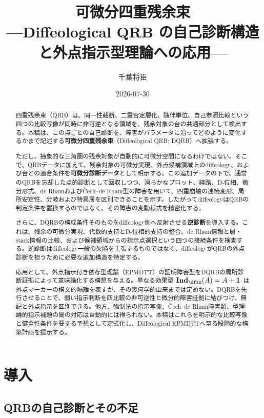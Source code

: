 \documentclass[a4paper,11pt]{ltjsarticle}
\title{可微分四重残余束\\
{\large ---Diffeological QRB の自己診断構造と外点指示型理論への応用---}}
\author{千葉将臣}
\date{2026-07-30}
\theoremstyle{definition}
\theoremstyle{plain}
\newcommand{\Ind}{\mathbf{Ind}_{\dfix}}
\newcommand{\Unit}{\mathbf 1}
\begin{document}
\maketitle

\begin{abstract}
四重残余束（QRB）は、同一性截断、二重否定層化、随伴単位、自己参照比較という四つの比較写像が同時に非可逆となる領域を、残余対象の台の共通部分として検出する。本稿は、この点ごとの自己診断を、障害がパラメータに沿ってどのように変化するかまで記述する\textbf{可微分四重残余束}（Diffeological QRB; DQRB）へ拡張する。

ただし、抽象的な三角圏の残余対象が自動的に可微分空間になるわけではない。そこで、QRBデータに加えて、残余対象の可微分実現、外点候補領域上のdiffeology、および台との適合条件を\textbf{可微分診断データ}として明示する。この追加データの下で、通常のQRBを忘却した点的診断として回収しつつ、滑らかなプロット、経路、D-位相、微分形式、de Rhamおよび\v{C}ech--de Rham型の障害を用いて、四重崩壊の連続変形、局所安定性、分岐および特異層を区別できることを示す。したがってdiffeologyはQRBの判定条件を置換するのではなく、その障害の変動様式を精密化する。

さらに、DQRBの構成条件そのものをdiffeology側へ反射させる\textbf{逆診断}を導入する。これは、残余の可微分実現、代数的支持とD-位相的支持の整合、de Rham情報と層・stack情報の比較、および候補領域からの指示点選択という四つの接続条件を検査する。逆診断はdiffeology一般の欠陥を主張するものではなく、diffeologyがQRBの外点診断を担うために必要な追加構造を特定する。

応用として、外点指示付き依存型理論（EPMDTT）の証明障害型をDQRBの局所診断証拠によって意味論化する構想を与える。単なる効果型 $\Ind(A)=A+\Unit$ は外点マーカーの構文的隔離を表すが、その幾何学的由来までは定めない。DQRBを先行させることで、弱い指示判断を四比較の非可逆性と微分的障害証拠に結びつけ、無記と外点指示を区別できる。他方、強制法の指示写像、\v{C}ech--de Rham障害類、型理論的指示補題の間の対応は自動的には得られない。本稿はこれらを明示的な比較写像と健全性条件を要する予想として定式化し、Diffeological EPMDTTへ至る段階的な構築計画を提示する。
\end{abstract}

\tableofcontents

\section{導入}

\subsection{QRBの自己診断とその不足}
\end{document}
